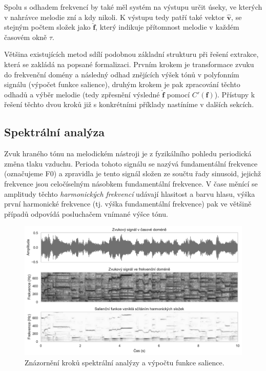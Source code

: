 Spolu s odhadem frekvencí by také měl systém na výstupu určit úseky, ve kterých v nahrávce melodie zní a kdy nikoli. K výstupu tedy patří také vektor $\hat{\mathbf{v}}$, se stejným počtem složek jako $\hat{\mathbf{f}}$, který indikuje přítomnost melodie v každém časovém okně $\tau$.

Většina existujících metod sdílí podobnou základní strukturu při řešení extrakce, která se zakládá na popsané formalizaci. Prvním krokem je transformace zvuku do frekvenční domény a následný odhad znějících výšek tónů v polyfonním signálu (výpočet funkce salience), druhým krokem je pak zpracování těchto odhadů a výběr melodie (tedy zpřesnění výsledné $\hat{\mathbf{f}}$ pomocí $C'(\mathbf{f})$). Přístupy k řešení těchto dvou kroků již s konkrétními příklady nastíníme v dalších sekcích.


\subsection{Spektrální analýza}

Zvuk hraného tónu na melodickém nástroji je z fyzikálního pohledu periodická změna tlaku vzduchu. Perioda tohoto signálu se nazývá fundamentální frekvence (označujeme F0) a zpravidla je tento signál složen ze součtu řady sinusoid, jejichž frekvence jsou celočíselným násobkem fundamentální frekvence. V čase měnící se amplitudy těchto \emph{harmonických frekvencí} udávají hlasitost a barvu hlasu, výška první harmonické frekvence (tj. výška fundamentální frekvence) pak ve většině případů odpovídá posluchačem vnímané výšce tónu. 

\begin{figure}[h]\centering
\includegraphics[width=\textwidth,height=\textheight,keepaspectratio]{../img/sig_spec_sal_grey}
\caption{Znázornění kroků spektrální analýzy a výpočtu funkce salience.}
\label{obr:sig_spec_sal}
\end{figure}


